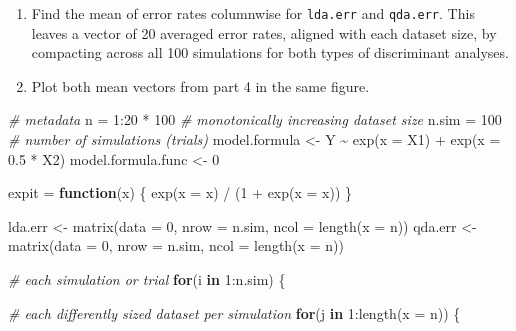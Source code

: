 \documentclass[
]{article}
\newenvironment{Shaded}{\begin{snugshade}}{\end{snugshade}}
\newcommand{\AttributeTok}[1]{\textcolor[rgb]{0.77,0.63,0.00}{#1}}
\newcommand{\CommentTok}[1]{\textcolor[rgb]{0.56,0.35,0.01}{\textit{#1}}}
\newcommand{\ControlFlowTok}[1]{\textcolor[rgb]{0.13,0.29,0.53}{\textbf{#1}}}
\newcommand{\DecValTok}[1]{\textcolor[rgb]{0.00,0.00,0.81}{#1}}
\newcommand{\FloatTok}[1]{\textcolor[rgb]{0.00,0.00,0.81}{#1}}
\newcommand{\FunctionTok}[1]{\textcolor[rgb]{0.00,0.00,0.00}{#1}}
\newcommand{\NormalTok}[1]{#1}
\newcommand{\OtherTok}[1]{\textcolor[rgb]{0.56,0.35,0.01}{#1}}
\newcommand{\SpecialCharTok}[1]{\textcolor[rgb]{0.00,0.00,0.00}{#1}}
\begin{document}
\begin{enumerate}
\def\labelenumi{\arabic{enumi}.}
\setcounter{enumi}{3}
\item
  Find the mean of error rates columnwise for \texttt{lda.err} and
  \texttt{qda.err}. This leaves a vector of 20 averaged error rates,
  aligned with each dataset size, by compacting across all 100
  simulations for both types of discriminant analyses.
\item
  Plot both mean vectors from part 4 in the same figure.
\end{enumerate}

\begin{Shaded}
\begin{Highlighting}[]
\CommentTok{\# metadata}
\NormalTok{n }\OtherTok{=} \DecValTok{1}\SpecialCharTok{:}\DecValTok{20} \SpecialCharTok{*} \DecValTok{100} \CommentTok{\# monotonically increasing dataset size}
\NormalTok{n.sim }\OtherTok{=} \DecValTok{100} \CommentTok{\# number of simulations (trials)}
\NormalTok{model.formula }\OtherTok{\textless{}{-}}\NormalTok{ Y }\SpecialCharTok{\textasciitilde{}} \FunctionTok{exp}\NormalTok{(}\AttributeTok{x =}\NormalTok{ X1) }\SpecialCharTok{+} \FunctionTok{exp}\NormalTok{(}\AttributeTok{x =} \FloatTok{0.5} \SpecialCharTok{*}\NormalTok{ X2)}
\NormalTok{model.formula.func }\OtherTok{\textless{}{-}} \DecValTok{0}

\NormalTok{expit }\OtherTok{=} \ControlFlowTok{function}\NormalTok{(x) \{}
  \FunctionTok{exp}\NormalTok{(}\AttributeTok{x =}\NormalTok{ x) }\SpecialCharTok{/}\NormalTok{ (}\DecValTok{1} \SpecialCharTok{+} \FunctionTok{exp}\NormalTok{(}\AttributeTok{x =}\NormalTok{ x))}
\NormalTok{\}}

\NormalTok{lda.err }\OtherTok{\textless{}{-}} \FunctionTok{matrix}\NormalTok{(}\AttributeTok{data =} \DecValTok{0}\NormalTok{, }\AttributeTok{nrow =}\NormalTok{ n.sim, }\AttributeTok{ncol =} \FunctionTok{length}\NormalTok{(}\AttributeTok{x =}\NormalTok{ n))}
\NormalTok{qda.err }\OtherTok{\textless{}{-}} \FunctionTok{matrix}\NormalTok{(}\AttributeTok{data =} \DecValTok{0}\NormalTok{, }\AttributeTok{nrow =}\NormalTok{ n.sim, }\AttributeTok{ncol =} \FunctionTok{length}\NormalTok{(}\AttributeTok{x =}\NormalTok{ n))}

\CommentTok{\# each simulation or trial}
\ControlFlowTok{for}\NormalTok{(i }\ControlFlowTok{in} \DecValTok{1}\SpecialCharTok{:}\NormalTok{n.sim) \{}
  
  \CommentTok{\# each differently sized dataset per simulation}
  \ControlFlowTok{for}\NormalTok{(j }\ControlFlowTok{in} \DecValTok{1}\SpecialCharTok{:}\FunctionTok{length}\NormalTok{(}\AttributeTok{x =}\NormalTok{ n)) \{}
    

\end{Highlighting}
\end{Shaded}
\end{document}
